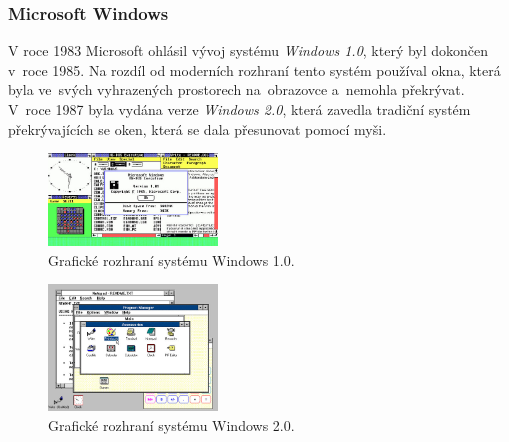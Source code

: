 \documentclass[11pt,twoside,a4paper]{book}
\begin{document}
\subsubsection{Microsoft Windows}
V roce 1983 Microsoft ohlásil vývoj systému \textit{Windows 1.0}, který byl dokončen v~roce 1985. Na rozdíl od moderních rozhraní tento systém používal okna, která byla ve~svých vyhrazených prostorech na~obrazovce a~nemohla překrývat. V~roce 1987 byla vydána verze \textit{Windows 2.0}, která zavedla tradiční systém překrývajících se oken, která se dala přesunovat pomocí myši.
\begin{figure}[!ht]
\begin{center}
  \includegraphics[width=0.4\textwidth]{win1}
\caption{{\label{fig:win1GUI}}Grafické rozhraní systému Windows 1.0.}
\end{center}
\end{figure}
\begin{figure}[!ht]
\begin{center}
  \includegraphics[width=0.4\textwidth]{win2}
\caption{{\label{fig:win2GUI}}Grafické rozhraní systému Windows 2.0.}
\end{center}
\end{figure}
\end{document}
